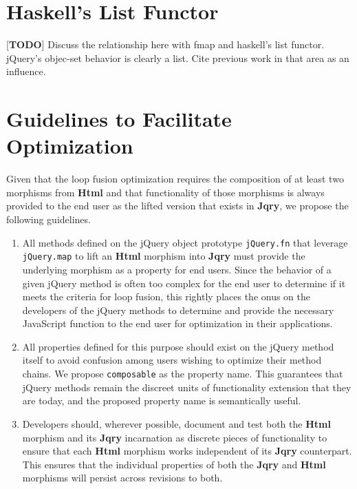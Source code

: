 \documentclass[preprint]{sigplanconf}
\begin{document}
\section{Haskell's List Functor}

[\textbf{TODO}] Discuss the relationship here with fmap and haskell's list functor. jQuery's objec-set behavior is clearly a list. Cite previous work in that area as an influence.

\section{Guidelines to Facilitate Optimization}

Given that the loop fusion optimization requires the composition of at least two morphisms from \textbf{Html} and that functionality of those morphisms is always provided to the end user as the lifted version that exists in \textbf{Jqry}, we propose the following guidelines.

\begin{enumerate}
  \item \label{item:standard-1} All methods defined on the jQuery object prototype \verb|jQuery.fn| that leverage \verb|jQuery.map| to lift an \textbf{Html} morphism into \textbf{Jqry} must provide the underlying morphism as a property for end users. Since the behavior of a given jQuery method is often too complex for the end user to determine if it meets the criteria for loop fusion, this rightly places the onus on the developers of the jQuery methods to determine and provide the necessary JavaScript function to the end user for optimization in their applications.
  \item \label{item:standard-2} All properties defined for this purpose should exist on the jQuery method itself to avoid confusion among users wishing to optimize their method chains. We propose \verb|composable| as the property name. This guarantees that jQuery methods remain the discreet units of functionality extension that they are today, and the proposed property name is semantically useful.
  \item \label{item:standard-3}Developers should, wherever possible, document and test both the \textbf{Html} morphism and its \textbf{Jqry} incarnation as discrete pieces of functionality to ensure that each \textbf{Html} morphism works independent of its \textbf{Jqry} counterpart. This ensures that the individual properties of both the \textbf{Jqry} and \textbf{Html} morphisms will persist across revisions to both.
\end{enumerate}
\end{document}
